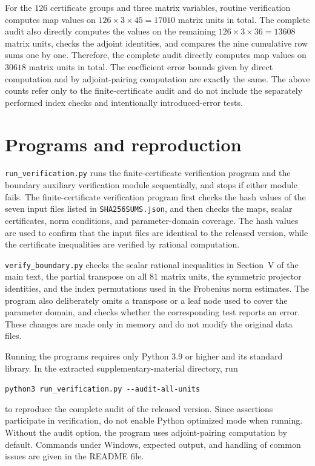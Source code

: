 \documentclass[aps,pra,onecolumn,notitlepage,10pt,amsmath,amssymb,nofootinbib]{revtex4-1}
\begin{document}
For the $126$ certificate groups and three matrix variables, routine verification computes map values on $126\times3\times45=17010$ matrix units in total. The complete audit also directly computes the values on the remaining $126\times3\times36=13608$ matrix units, checks the adjoint identities, and compares the nine cumulative row sums one by one. Therefore, the complete audit directly computes map values on $30618$ matrix units in total. The coefficient error bounds given by direct computation and by adjoint-pairing computation are exactly the same. The above counts refer only to the finite-certificate audit and do not include the separately performed index checks and intentionally introduced-error tests.

\section{Programs and reproduction}

\texttt{run\_verification.py} runs the finite-certificate verification program and the boundary auxiliary verification module sequentially, and stops if either module fails. The finite-certificate verification program first checks the hash values of the seven input files listed in \texttt{SHA256SUMS.json}, and then checks the maps, scalar certificates, norm conditions, and parameter-domain coverage. The hash values are used to confirm that the input files are identical to the released version, while the certificate inequalities are verified by rational computation.

\texttt{verify\_boundary.py} checks the scalar rational inequalities in Section~V of the main text, the partial transpose on all $81$ matrix units, the symmetric projector identities, and the index permutations used in the Frobenius norm estimates. The program also deliberately omits a transpose or a leaf node used to cover the parameter domain, and checks whether the corresponding test reports an error. These changes are made only in memory and do not modify the original data files.

Running the programs requires only Python 3.9 or higher and its standard library. In the extracted supplementary-material directory, run
\begin{center}
\texttt{python3 run\_verification.py -{}-audit-all-units}
\end{center}
to reproduce the complete audit of the released version. Since assertions participate in verification, do not enable Python optimized mode when running. Without the audit option, the program uses adjoint-pairing computation by default. Commands under Windows, expected output, and handling of common issues are given in the README file.
\end{document}
